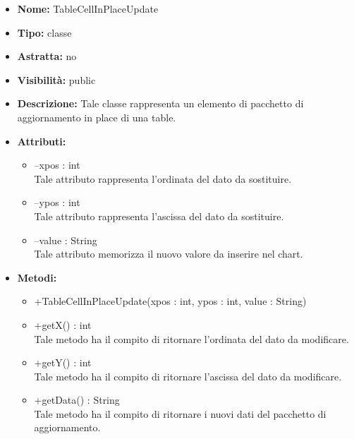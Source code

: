			
			\begin{itemize}
			\item \textbf{Nome:} TableCellInPlaceUpdate
			\item \textbf{Tipo:} classe
			
		\item \textbf{Astratta:}
		no
			\item \textbf{Visibilità:} public
			\item \textbf{Descrizione:} Tale classe rappresenta un elemento di pacchetto di aggiornamento in place di una table.
			\item \textbf{Attributi:}
				\begin{itemize}
				\setlength{\itemsep}{5pt}
				
					\item[\ding{111}] {--xpos : int} \\ [1mm] Tale attributo rappresenta l'ordinata del dato da sostituire.
					\item[\ding{111}] {--ypos : int} \\ [1mm] Tale attributo rappresenta l'ascissa del dato da sostituire.
					\item[\ding{111}] {--value : String} \\ [1mm] Tale attributo memorizza il nuovo valore da inserire nel chart.
				\end{itemize}
		
			\item \textbf{Metodi:}
				\begin{itemize}
				\setlength{\itemsep}{5pt}
				
					\item[\ding{111}] {{+TableCellInPlaceUpdate(xpos : int, ypos : int, value : String)}}
					\item[\ding{111}] {{+getX() : int}} \\ [1mm] Tale metodo ha il compito di ritornare l'ordinata del dato da modificare.
					\item[\ding{111}] {{+getY() : int}} \\ [1mm] Tale metodo ha il compito di ritornare l'ascissa del dato da modificare.
					\item[\ding{111}] {{+getData() : String}} \\ [1mm] Tale metodo ha il compito di ritornare i nuovi dati del pacchetto di aggiornamento.
				\end{itemize}
		
			\end{itemize}
	
